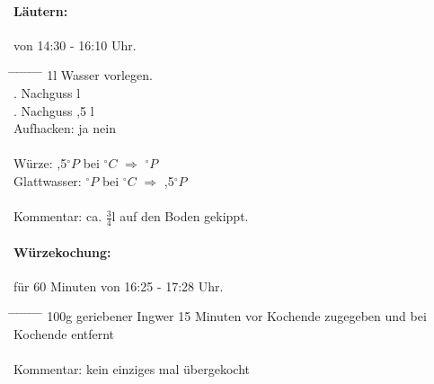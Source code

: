 \documentclass[12pt,oneside,a4paper]{scrartcl}
\begin{document}
\paragraph{Läutern:} von 14:30 - 16:10 Uhr.
	\begin{tabbing}
		\hspace{1cm} \= \hspace{1cm} \= \hspace{1cm} \= \hspace{1cm} \= \hspace{1cm} \=\hspace{1cm} \=\hspace{1cm} \=\hspace{1cm} \= \kill
		\> 1l Wasser vorlegen.\\
		\> . Nachguss \> \> 3 l\\
		\> . Nachguss \> ,5 l\\
		\> \> \> Aufhacken: \> \> \CheckedBox ja \> \> \Square nein\\\\
		\> Würze: \> \> ,5$^\circ P$ \> bei $^\circ C$ \> $\Rightarrow$ $^\circ P$\\
		\> Glattwasser: \> \> $^\circ P$ \> bei $^\circ C$ \> $\Rightarrow$ ,5$^\circ P$\\\\
		\> Kommentar: \> \> \> ca. $\frac{3}{4}$l auf den Boden gekippt.
	\end{tabbing}
%
\paragraph{Würzekochung:} für 60 Minuten von 16:25 - 17:28 Uhr.
	\begin{tabbing}
		\hspace{1cm} \= \hspace{1cm} \= \hspace{1cm} \= \hspace{1cm} \= \hspace{1cm} \= \hspace{1cm} \= \hspace{1cm} \= \hspace{1cm} \= \kill
		\> 100g geriebener Ingwer 15 Minuten vor Kochende zugegeben und bei Kochende entfernt\\\\
		\> Kommentar: \> \> \> kein einziges mal übergekocht
	\end{tabbing}
%
\end{document}
